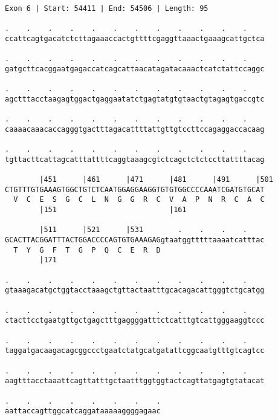 \documentclass{article}
\begin{document}
\begin{Verbatim}[fontfamily=courier]
Exon 6 | Start: 54411 | End: 54506 | Length: 95

.    .    .    .    .    .    .    .    .    .    .    .    
ccattcagtgacatctcttagaaaccactgttttcgaggttaaactgaaagcattgctca

.    .    .    .    .    .    .    .    .    .    .    .    
gatgcttcacggaatgagaccatcagcattaacatagatacaaactcatctattccaggc

.    .    .    .    .    .    .    .    .    .    .    .    
agctttacctaagagtggactgaggaatatctgagtatgtgtaactgtagagtgaccgtc

.    .    .    .    .    .    .    .    .    .    .    .    
caaaacaaacaccagggtgactttagacattttattgttgtccttccagaggaccacaag

.    .    .    .    .    .    .    .    .    .    .    .    
tgttacttcattagcatttattttcaggtaaagcgtctcagctctctccttattttacag

        |451      |461      |471      |481      |491      |501
CTGTTTGTGAAAGTGGCTGTCTCAATGGAGGAAGGTGTGTGGCCCCAAATCGATGTGCAT
  V  C  E  S  G  C  L  N  G  G  R  C  V  A  P  N  R  C  A  C
        |151                          |161                  

        |511      |521      |531        .    .    .    .    
GCACTTACGGATTTACTGGACCCCAGTGTGAAAGAGgtaatggtttttaaaatcatttac
  T  Y  G  F  T  G  P  Q  C  E  R  D                        
        |171                                                

.    .    .    .    .    .    .    .    .    .    .    .    
gtaaagacatgctggtacctaaagctgttactaatttgcacagacattgggtctgcatgg

.    .    .    .    .    .    .    .    .    .    .    .    
ctacttcctgaatgttgctgagctttgaggggatttctcatttgtcattgggaaggtccc

.    .    .    .    .    .    .    .    .    .    .    .    
taggatgacaagacagcggccctgaatctatgcatgatattcggcaatgtttgtcagtcc

.    .    .    .    .    .    .    .    .    .    .    .    
aagtttacctaaattcagttatttgctaatttggtggtactcagttatgagtgtatacat

.    .    .    .    .    .    .    .
aattaccagttggcatcaggataaaaaggggagaac
\end{Verbatim}
\newpage
\end{document}

